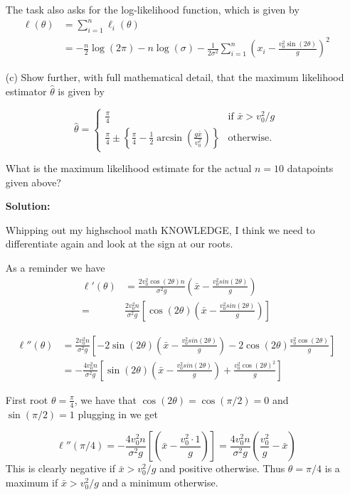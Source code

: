 \documentclass{article}
\begin{document}
\begin{enumerate}
The task also asks for the log-likelihood function, which is given by
\begin{align*}
    \ell(\theta) &= \sum_{i=1}^n \ell_i(\theta)\\
    &= -\frac{n}{2} \log(2\pi) - n \log(\sigma) - \frac{1}{2\sigma^2} \sum_{i=1}^n \left(x_i - \frac{v_0^2 \sin(2\theta)}{g}\right)^2
\end{align*}

\item[(c)] 
Show further, with full mathematical detail, that the maximum likelihood estimator $\hat{\theta}$ is given by

\[
\hat{\theta} = \left\{
\begin{array}{ll}
\frac{\pi}{4} & \text{if } \bar{x} > v_0^2 / g \\
\frac{\pi}{4} \pm \left\{ \frac{\pi}{4} - \frac{1}{2} \arcsin \left( \frac{g\bar{x}}{v_0^2} \right) \right\} & \text{otherwise.}
\end{array}
\right.
\]

What is the maximum likelihood estimate for the actual $n = 10$ datapoints given above?


\textbf{Solution:}
\par
Whipping out my highschool math KNOWLEDGE, I think we need to differentiate again and look at the sign at our roots.

As a reminder we have
\begin{align*}
    \ell'(\theta) &= \frac{2 v_0^2 \cos(2\theta) n }{\sigma^2 g} \left( \bar{x}  - \frac{v_0^2 sin(2 \theta)}{g}\right)\\    
    =& \frac{2 v_0^2 n}{\sigma^2 g} \left[\cos(2\theta)  \left( \bar{x}  - \frac{v_0^2 sin(2 \theta)}{g}\right)\right] 
\end{align*} 

\begin{align*}
\ell''(\theta) &= \frac{2  v_0^2  n}{\sigma^2 g} \left[ -2 \sin(2\theta)  \left( \bar{x}  - \frac{v_0^2 sin(2 \theta)}{g}\right) - 2 \cos(2\theta) \frac{v_0^2 \cos(2\theta)}{g} \right]\\
&= -\frac{4 v_0^2 n}{\sigma^2 g} \left[ \sin(2\theta)  \left( \bar{x}  - \frac{v_0^2 sin(2 \theta)}{g}\right) + \frac{v_0^2 \cos(2\theta)^2}{g} \right]
\end{align*}

First root $\theta = \frac{\pi}{4}$, we have that $\cos(2 \theta) = \cos(\pi/2) = 0$ and $\sin(\pi/2) = 1$
plugging in we get

\[
\ell''(\pi/4) = -\frac{4 v_0^2 n}{\sigma^2 g} \left[ \left( \bar{x}  - \frac{v_0^2 \cdot 1}{g}\right)\right] = \frac{4 v_0^2 n}{\sigma^2 g} \left( \frac{v_0^2}{g} -  \bar{x}  \right)
\]
This is clearly negative if $\bar{x} > v_0^2 / g$ and positive otherwise. Thus $\theta = \pi/4$ is a maximum if $\bar{x} > v_0^2 / g$ and a minimum otherwise.



\end{enumerate}
\end{document}
